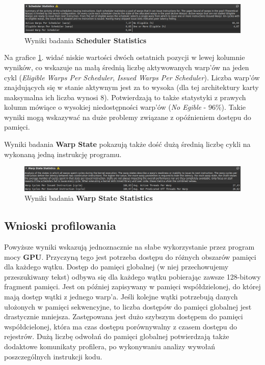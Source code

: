 \begin{figure}[H]
    \centering
    \includegraphics[width=\linewidth]{images/Scheduler.png}
    \caption{Wyniki badania \textbf{Scheduler Statistics}}
    \label{fig:scheduler}
\end{figure}

Na grafice \ref{fig:scheduler}. widać niskie wartości dwóch ostatnich pozycji w lewej kolumnie wyników, co wskazuje na małą średnią liczbę aktywowanych warp'ów na jeden cykl (\textit{Eligible Warps Per Scheduler}, \textit{Issued Warps Per Scheduler}). Liczba warp'ów znajdujących się w stanie aktywnym jest za to wysoka (dla tej architektury karty maksymalna ich liczba wynosi 8). Potwierdzają to także statystyki z prawych kolumn mówiące o wysokiej niedostępności warp'ów (\textit{No Egible} - 96\%). Takie wyniki mogą wskazywać na duże problemy związane z opóźnieniem dostępu do pamięci.

Wyniki badania \textbf{Warp State} pokazują także dość dużą średnią liczbę cykli na wykonaną jedną instrukcję programu.

\begin{figure}[H]
    \centering
    \includegraphics[width=\linewidth]{images/WarpState.png}
    \caption{Wyniki badania \textbf{Warp State Statistics}}
    \label{fig:warps}
\end{figure}

\subsection{Wnioski profilowania}

Powyższe wyniki wskazują jednoznacznie na słabe wykorzystanie przez program mocy \textbf{GPU}. Przyczyną tego jest potrzeba dostępu do różnych obszarów pamięci dla każdego wątku. Dostęp do pamięci globalnej (w niej przechowujemy przeszukiwany tekst) odbywa się dla każdego wątku pobierając zawsze 128-bitowy fragment pamięci. Jest on później zapisywany w pamięci współdzielonej, do której mają dostęp wątki z jednego warp'a. Jeśli kolejne wątki potrzebują danych ułożonych w pamięci sekwencyjne, to liczba dostępów do pamięci globalnej jest drastycznie mniejsza. Zastępowana jest dużo szybszym dostępem do pamięci współdcielonej, która ma czas dostępu porównywalny z czasem dostępu do rejestrów. Dużą liczbę odwołań do pamięci globalnej potwierdzają także dodaktowe komunikaty profilera, po wykonywaniu analizy wywołań poszczególnych instrukcji kodu. 

